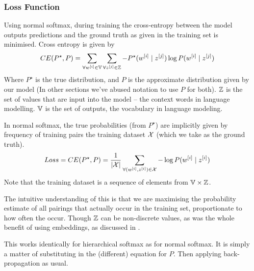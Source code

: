 \documentclass[parskip]{komatufte}
\begin{document}
\subsubsection{Loss Function}\label{sec:softmax-loss-function}


Using normal softmax, during training the cross-entropy between the model outputs predictions and the ground truth as given in the training set is minimised.
Cross entropy is given by
\begin{equation}
CE(P^\star, P) = \sum_{\forall \n w_i\in \set{V}} \sum_{\forall \n z_j \in \set{Z}} -P^\star(\n w_i \mid \n z_j) \log P(\n w_i \mid \n z_j)
\end{equation}
Where $P^\star$ is the true distribution, and $P$ is the approximate distribution given by our model (In other sections we've abused notation to use $P$ for both).
$\mathbb{Z}$ is the set of values that are input into the model -- the context words in language modelling.
$\mathbb{V}$ is the set of outputs, the vocabulary in language modeling.

In normal softmax, the true probabilities (from $P^\star$) are implicitly given by frequency of training pairs the training dataset $\mathcal{X}$ (which we take as the ground truth).
\begin{equation}
Loss=CE(P^\star, P) = \frac{1}{|\seq{X}|} \sum_{\forall (\n w_i, \n z_i) \in \seq{X}} -\log P(\n w_i \mid \n z_i)
\end{equation}
Note that the training dataset is a sequence of elements from $\mathbb{V} \times \mathbb{Z}$.

The intuitive understanding of this is that we are maximising the probability estimate of all pairings that actually occur in the training set, proportionate to how often the occur.
Though $\mathbb{Z}$ can be non-discrete values, as was the whole benefit of using embeddings, as discussed in .

This works identically for hierarchical softmax as for normal softmax.
It is simply a matter of substituting in the (different) equation for $P$.
Then applying back-propagation as usual.
\end{document}
